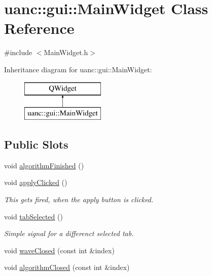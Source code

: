 \hypertarget{classuanc_1_1gui_1_1_main_widget}{}\section{uanc\+:\+:gui\+:\+:Main\+Widget Class Reference}
\label{classuanc_1_1gui_1_1_main_widget}


{\ttfamily \#include $<$Main\+Widget.\+h$>$}

Inheritance diagram for uanc\+:\+:gui\+:\+:Main\+Widget\+:\begin{figure}[H]
\begin{center}
\leavevmode
\includegraphics[height=2.000000cm]{classuanc_1_1gui_1_1_main_widget}
\end{center}
\end{figure}
\subsection*{Public Slots}
\begin{DoxyCompactItemize}
\item 
void \hyperlink{classuanc_1_1gui_1_1_main_widget_ac2e8a417bf4e8b90b707168a9dc65642}{algorithm\+Finished} ()
\item 
void \hyperlink{classuanc_1_1gui_1_1_main_widget_a2c4e4db69935d33facd4280e7dd66b05}{apply\+Clicked} ()
\begin{DoxyCompactList}\small\item\em This gets fired, when the apply button is clicked. \end{DoxyCompactList}\item 
void \hyperlink{classuanc_1_1gui_1_1_main_widget_a3e724b26e32f136b0e8f443075ec05e1}{tab\+Selected} ()
\begin{DoxyCompactList}\small\item\em Simple signal for a differenct selected tab. \end{DoxyCompactList}\item 
void \hyperlink{classuanc_1_1gui_1_1_main_widget_a210dbd2254febbd5e356e0b0a955f052}{wave\+Closed} (const int \&index)
\item 
void \hyperlink{classuanc_1_1gui_1_1_main_widget_a01f7a68c0a5fb934183710176625cac4}{algorithm\+Closed} (const int \&index)
\end{DoxyCompactItemize}
